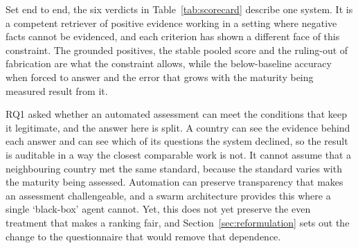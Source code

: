 Set end to end, the six verdicts in Table~\ref{tab:scorecard} describe one system. It is a competent retriever of positive evidence working in a setting where negative facts cannot be evidenced, and each criterion has shown a different face of this constraint. The grounded positives, the stable pooled score and the ruling-out of fabrication are what the constraint allows, while the below-baseline accuracy when forced to answer and the error that grows with the maturity being measured result from it.

RQ1 asked whether an automated assessment can meet the conditions that keep it legitimate, and the answer here is split. A country can see the evidence behind each answer and can see which of its questions the system declined, so the result is auditable in a way the closest comparable work is not. It cannot assume that a neighbouring country met the same standard, because the standard varies with the maturity being assessed. Automation can preserve transparency that makes an assessment challengeable, and a swarm architecture provides this where a single `black-box' agent cannot. Yet, this does not yet preserve the even treatment that makes a ranking fair, and Section~\ref{sec:reformulation} sets out the change to the questionnaire that would remove that dependence.

